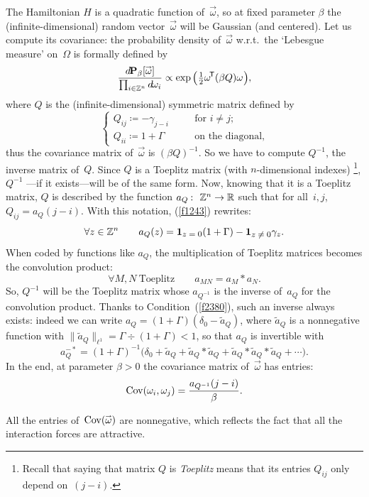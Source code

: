 The Hamiltonian $H$ is a quadratic function of~$\vec\omega$,
so at fixed parameter $\beta$ the (infinite-dimensional) random vector~$\vec\omega$
will be Gaussian (and centered).
Let us compute its covariance:
the probability density of~$\vec\omega$ w.r.t.\ the `Lebesgue measure' on~$\Omega$
is formally defined by
\[ \frac{\dx\Pr_\beta [\vec\omega]}{\prod_{i\in\ZZ^n}\dx{\omega_i}} \propto
\exp \Big({\textstyle\frac{1}{2}} \T{\omega} (\beta Q) \omega \Big), \]
where $Q$ is the (infinite-dimensional) symmetric matrix defined by
\[\label{f1243} \left\{ \begin{array}{ccl} Q_{ij} \coloneqq -\gamma_{j-i} & \quad & \text{for $i\neq j$;} \\
Q_{ii} \coloneqq 1 + \Gamma & \quad & \text{on the diagonal,} \end{array} \right.\]
%
thus the covariance matrix of~$\vec\omega$ is $(\beta Q)^{-1}$.
So we have to compute $Q^{-1}$, the inverse matrix of~$Q$.
Since $Q$ is a Toeplitz matrix (with $n$-dimensional indexes)%
\footnote{Recall that saying that matrix $Q$ is \emph{Toeplitz}
means that its entries $Q_{ij}$ only depend on~$(j-i)$.},
$Q^{-1}$ —if it exists—will be of the same form.
Now, knowing that it is a Toeplitz matrix, $Q$ is described by the function
$a_Q \colon \ZZ^n \to \RR$ such that for all~$i,j$, $Q_{ij} = a_Q(j-i)$.
With this notation, (\ref{f1243}) rewrites:
\[ \forall z\in\ZZ^n \qquad a_Q(z) = \1{z=0} (1+\Gamma) - \1{z\neq0} \gamma_z .\]
%
When coded by functions like $a_Q$,
the multiplication of Toeplitz matrices becomes the convolution product:
\[ \forall M, N \ \text{Toeplitz} \qquad a_{MN} = a_M * a_N .\]
So, $Q^{-1}$ will be the Toeplitz matrix
whose $a_{Q^{-1}}$ is the inverse of~$a_Q$ for the convolution product.
Thanks to Condition~(\ref{f2380}), such an inverse always exists:
indeed we can write $a_Q = (1+\Gamma) (\delta_{0} - \tilde{a}_Q)$,
where $\tilde{a}_Q$ is a nonnegative function with
$\|\tilde{a}_Q\|_{\ell^1} = \Gamma \div (1+\Gamma) < 1$,
so that $a_Q$ is invertible with
\[\label{f0024} a_Q^{-*} = (1+\Gamma)^{-1} \big(\delta_{0} + \tilde{a}_Q +
\tilde{a}_Q * \tilde{a}_Q + \tilde{a}_Q * \tilde{a}_Q * \tilde{a}_Q + \cdots \big) .\]
In the end, at parameter $\beta>0$ the covariance matrix of~$\vec\omega$ has entries:
\[\label{f3366} \operatorname{Cov}(\omega_i,\omega_j) = \frac{a_{Q^{-1}}(j-i)}{\beta} .\]

\begin{Rmk}
All the entries of~$\Cov(\vec\omega)$ are nonnegative,
which reflects the fact that all the interaction forces are attractive.
\end{Rmk}

